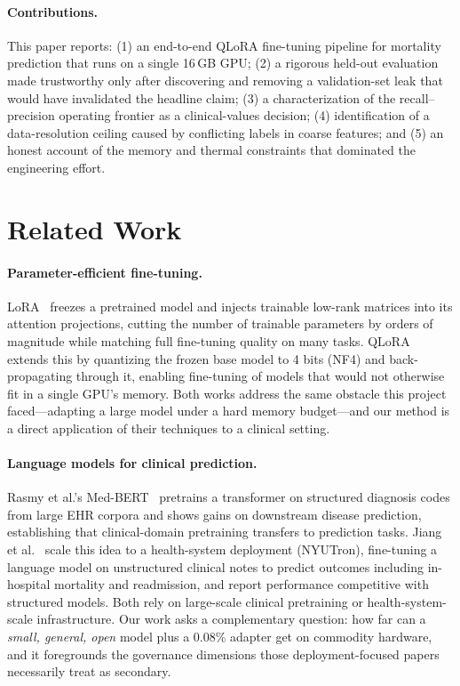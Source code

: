 \documentclass[sigconf,nonacm]{acmart}
\begin{document}
\paragraph{Contributions.} This paper reports:
(1) an end-to-end QLoRA fine-tuning pipeline for mortality prediction that runs
on a single 16\,GB GPU;
(2) a rigorous held-out evaluation made trustworthy only after discovering and
removing a validation-set leak that would have invalidated the headline claim;
(3) a characterization of the recall--precision operating frontier as a
clinical-values decision;
(4) identification of a data-resolution ceiling caused by conflicting labels in
coarse features; and
(5) an honest account of the memory and thermal constraints that dominated the
engineering effort.

\section{Related Work}
\paragraph{Parameter-efficient fine-tuning.}
LoRA~\cite{lora} freezes a pretrained model and injects trainable low-rank
matrices into its attention projections, cutting the number of trainable
parameters by orders of magnitude while matching full fine-tuning quality on
many tasks. QLoRA~\cite{qlora} extends this by quantizing the frozen base model
to 4 bits (NF4) and back-propagating through it, enabling fine-tuning of models
that would not otherwise fit in a single GPU's memory. Both works address the
same obstacle this project faced---adapting a large model under a hard memory
budget---and our method is a direct application of their techniques to a
clinical setting.

\paragraph{Language models for clinical prediction.}
Rasmy et al.'s Med-BERT~\cite{medbert} pretrains a transformer on structured
diagnosis codes from large EHR corpora and shows gains on downstream disease
prediction, establishing that clinical-domain pretraining transfers to
prediction tasks. Jiang et al.~\cite{nyutron} scale this idea to a
health-system deployment (NYUTron), fine-tuning a language model on unstructured
clinical notes to predict outcomes including in-hospital mortality and
readmission, and report performance competitive with structured models. Both
rely on large-scale clinical pretraining or health-system-scale infrastructure.
Our work asks a complementary question: how far can a \emph{small, general,
open} model plus a 0.08\% adapter get on commodity hardware, and it foregrounds
the governance dimensions those deployment-focused papers necessarily treat as
secondary.
\end{document}
